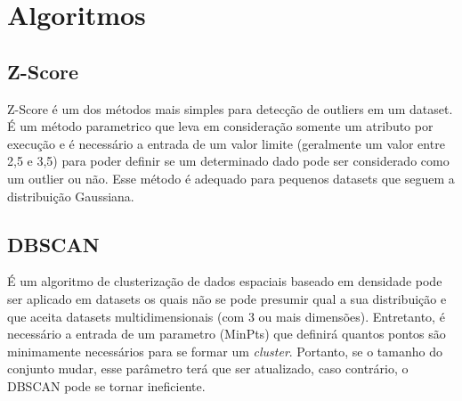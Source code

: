 \section{Algoritmos}

\subsection{Z-Score}


Z-Score é um dos métodos mais simples para detecção de outliers em um dataset. É um método parametrico que leva em consideração somente um atributo por execução e é necessário a entrada de um valor limite (geralmente um valor entre 2,5 e 3,5) para poder definir se um determinado dado pode ser considerado como um outlier ou não. Esse método é adequado para pequenos datasets que seguem a distribuição Gaussiana.

\subsection{DBSCAN}


É um algoritmo de clusterização de dados espaciais baseado em densidade \cite{Ester:1996:DAD:3001460.3001507} pode ser aplicado em datasets os quais não se pode presumir qual a sua distribuição e que aceita datasets multidimensionais (com 3 ou mais dimensões). Entretanto, é necessário a entrada de um parametro (MinPts) que definirá quantos pontos são minimamente necessários para se formar um \textit{cluster}. Portanto, se o tamanho do conjunto mudar, esse parâmetro terá que ser atualizado, caso contrário, o DBSCAN pode se tornar ineficiente.

